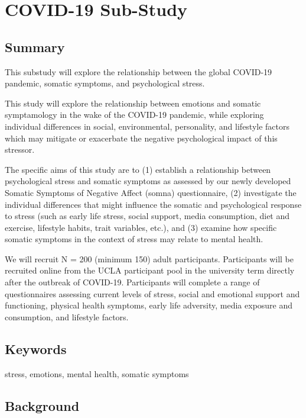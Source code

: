 \documentclass[]{book}
\begin{document}
\hypertarget{covid-19-sub-study}{%
\chapter{COVID-19 Sub-Study}\label{covid-19-sub-study}}

\hypertarget{summary-1}{%
\section{Summary}\label{summary-1}}

This substudy will explore the relationship between the global COVID-19 pandemic, somatic symptoms, and psychological stress.

This study will explore the relationship between emotions and somatic symptamology in the wake of the COVID-19 pandemic, while exploring individual differences in social, environmental, personality, and lifestyle factors which may mitigate or exacerbate the negative psychological impact of this stressor.

The specific aims of this study are to (1) establish a relationship between psychological stress and somatic symptoms as assessed by our newly developed Somatic Symptoms of Negative Affect (somna) questionnaire, (2) investigate the individual differences that might influence the somatic and psychological response to stress (such as early life stress, social support, media consumption, diet and exercise, lifestyle habits, trait variables, etc.), and (3) examine how specific somatic symptoms in the context of stress may relate to mental health.

We will recruit N = 200 (minimum 150) adult participants. Participants will be recruited online from the UCLA participant pool in the university term directly after the outbreak of COVID-19. Participants will complete a range of questionnaires assessing current levels of stress, social and emotional support and functioning, physical health symptoms, early life adversity, media exposure and consumption, and lifestyle factors.

\hypertarget{keywords-1}{%
\section{Keywords}\label{keywords-1}}

stress, emotions, mental health, somatic symptoms

\hypertarget{background-1}{%
\section{Background}\label{background-1}}
\end{document}

